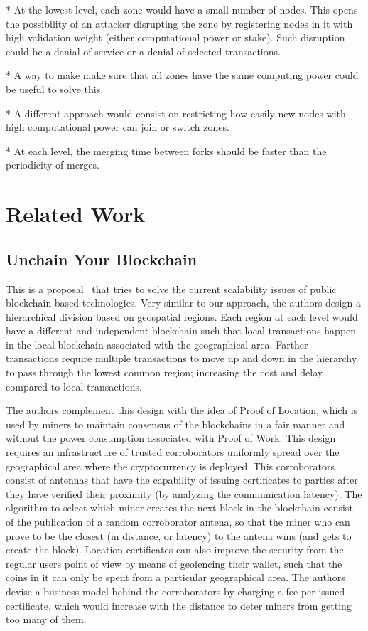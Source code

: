 * At the lowest level, each zone would have a small number of nodes.  This
opens the possibility of an attacker disrupting the zone by registering nodes
in it with high validation weight (either computational power or stake).  Such
disruption could be a denial of service or a denial of selected transactions.

* A way to make make sure that all zones have the same computing power could be
useful to solve this.

* A different approach would consist on restricting how easily new nodes with
high computational power can join or switch zones.

* At each level, the merging time between forks should be faster than the
periodicity of merges.

\section{Related Work}

\subsection{Unchain Your Blockchain}

This is a proposal~\cite{unchain} that tries to solve the current scalability
issues of public blockchain based technologies.  Very similar to our approach,
the authors design a hierarchical division based on geospatial regions.  Each
region at each level would have a different and independent blockchain such
that local transactions happen in the local blockchain associated with the
geographical area.  Farther transactions require multiple transactions to move
up and down in the hierarchy to pass through the lowest common region;
increasing the cost and delay compared to local transactions.


The authors complement this design with the idea of Proof of Location, which is
used by miners to maintain consensus of the blockchains in a fair manner and
without the power consumption associated with Proof of Work.  This design
requires an infrastructure of trusted corroborators uniformly spread over the
geographical area where the cryptocurrency is deployed.  This corroborators
consist of antennas that have the capability of issuing certificates to parties
after they have verified their proximity (by analyzing the communication
latency).  The algorithm to select which miner creates the next block in the
blockchain consist of the publication of a random corroborator antena, so that
the miner who can prove to be the closest (in distance, or latency) to the
antena wins (and gets to create the block).  Location certificates can also
improve the security from the regular users point of view by means of
geofencing their wallet, such that the coins in it can only be spent from a
particular geographical area.  The authors devise a business model behind the
corroborators by charging a fee per issued certificate, which would increase
with the distance to deter miners from getting too many of them.


